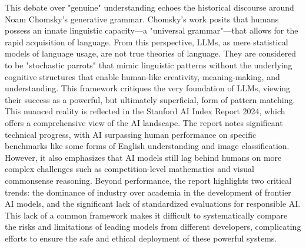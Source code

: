 \documentclass[12pt]{article}
\begin{document}
This debate over "genuine" understanding echoes the historical discourse around Noam Chomsky's generative grammar. Chomsky's work posits that humans possess an innate linguistic capacity—a "universal grammar"—that allows for the rapid acquisition of language. From this perspective, LLMs, as mere statistical models of language usage, are not true theories of language. They are considered to be "stochastic parrots" that mimic linguistic patterns without the underlying cognitive structures that enable human-like creativity, meaning-making, and understanding. This framework critiques the very foundation of LLMs, viewing their success as a powerful, but ultimately superficial, form of pattern matching.\cite{inproceedings}\cite{Chomsky}\\
This nuanced reality is reflected in the Stanford AI Index Report 2024, which offers a comprehensive view of the AI landscape. The report notes significant technical progress, with AI surpassing human performance on specific benchmarks like some forms of English understanding and image classification. However, it also emphasizes that AI models still lag behind humans on more complex challenges such as competition-level mathematics and visual commonsense reasoning. Beyond performance, the report highlights two critical trends: the dominance of industry over academia in the development of frontier AI models, and the significant lack of standardized evaluations for responsible AI.\cite{aiindex} This lack of a common framework makes it difficult to systematically compare the risks and limitations of leading models from different developers, complicating efforts to ensure the safe and ethical deployment of these powerful systems.\cite{ethicalAi}
\end{document}

